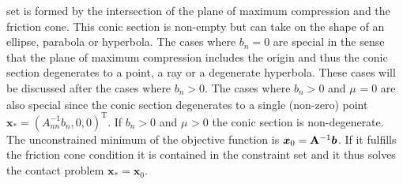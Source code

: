 \documentclass[global,twocolumn]{svjour}
\let\vec\bm
\newcommand{\mat}[1]{{\bf #1}}
\newcommand{\transp}{{\mathrm{T}}}
\newcommand{\cof}[1]{\ensuremath{\mu_{#1}}}
\begin{document}
			set is formed by the intersection of the plane of maximum compression and the friction cone.
			This conic section is non-empty but can take on the shape of an ellipse, parabola or hyperbola.
			The cases where $b_n = 0$ are special in the sense that the plane of maximum compression includes
			the origin and thus the conic section degenerates to a point, a ray or a degenerate hyperbola.
			These cases will be discussed after the cases where $b_n > 0$.
			The cases where $b_n > 0$ and $\cof{} = 0$ are also special
			since the conic section degenerates to a single (non-zero) point $\vec x_* = (A_{nn}^{-1} b_n, 0, 0)^\transp$.
			If $b_n > 0$ and $\cof{} > 0$ the conic section is non-degenerate. The unconstrained minimum of
			the objective function is $\vec x_0 = \mat{A}^{-1} \vec b$. If it fulfills the friction cone condition it is
			contained in the constraint set and it thus solves the contact problem $\vec x_* = \vec x_0$.
			
\end{document}
